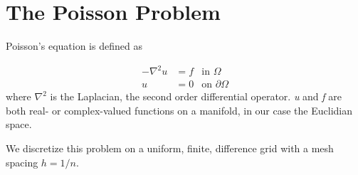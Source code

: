 \section{The Poisson Problem}

Poisson's equation is defined as

\begin{align}
  - \nabla ^2 u &= f &\text{in~} \Omega \\
  u &= 0 &\text{on~} \partial\Omega
\end{align}
where $\nabla^2$ is the Laplacian, the second order differential
operator. {\em u} and {\em f} are both real- or complex-valued functions on a
manifold, in our case the Euclidian space.

We discretize this problem on a uniform, finite, difference grid with a mesh
spacing $h = 1/n$.

